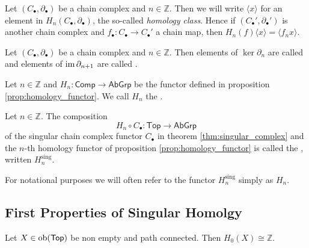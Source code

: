 \begin{remark}
	Let $(C_\bullet,\partial_\bullet)$ be a chain complex and $n \in \mathbb{Z}$. Then we will write $\langle x \rangle$ for an element in $H_n(C_\bullet,\partial_\bullet)$, the so-called \emph{homology class}. Hence if $(C_\bullet',\partial_\bullet')$ is another chain complex and $f_\bullet : C_\bullet \to C_\bullet'$ a chain map, then $H_n(f)\langle x \rangle = \langle f_nx\rangle$. 
\end{remark}

\begin{definition}
	Let $(C_\bullet,\partial_\bullet)$ be a chain complex and $n \in \mathbb{Z}$. Then elements of $\ker \partial_n$ are called  and elements of $\operatorname{im} \partial_{n + 1}$ are called .
\end{definition}

\begin{definition}
	Let $n \in \mathbb{Z}$ and $H_n : \mathsf{Comp} \to \mathsf{AbGrp}$ be the functor defined in proposition \ref{prop:homology_functor}. We call $H_n$ the .
\end{definition}

\begin{definition}
	Let $n \in \mathbb{Z}$. The composition 
	\begin{equation}
		H_n \circ C_\bullet : \mathsf{Top} \to \mathsf{AbGrp}
	\end{equation}
	\noindent of the singular chain complex functor $C_\bullet$ in theorem \ref{thm:singular_complex} and the $n$-th homology functor of proposition \ref{prop:homology_functor} is called the , written $H^{\mathrm{sing}}_n$.
\end{definition}

\begin{remark}
	For notational purposes we will often refer to the functor $H_n^{\mathrm{sing}}$ simply as $H_n$.
\end{remark}

\subsection*{First Properties of Singular Homolgy}

\begin{proposition}
	Let $X \in \operatorname{ob}(\mathsf{Top})$ be non empty and path connected. Then $H_0(X) \cong \mathbb{Z}$.
\end{proposition}

